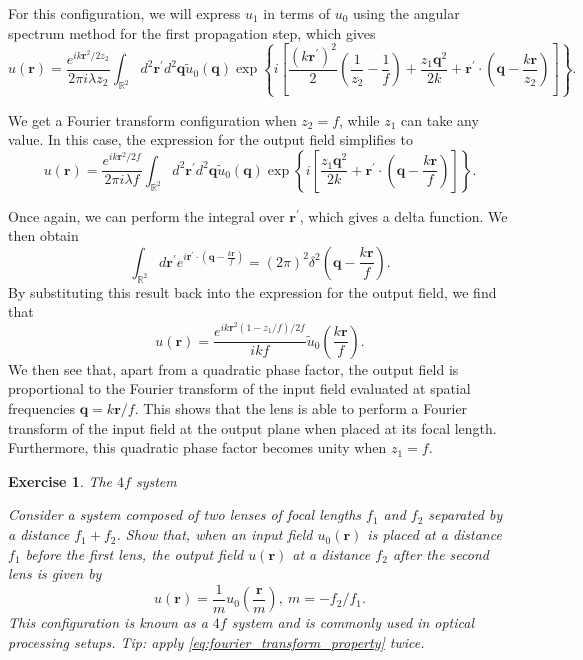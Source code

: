 \documentclass[a4paper,10pt]{article}
\newtheorem{exe}{Exercise}
\begin{document}
For this configuration, we will express $u_1$ in terms of $u_0$ using the angular spectrum method for the first propagation step, which gives
\begin{equation}
    u(\mathbf{r}) = \frac{e^{i k \mathbf{r}^2 / 2 z_2}}{2\pi i \lambda z_2} \int_{\mathbb{R}^2} d^2\mathbf{r}^\prime d^2 \mathbf{q}  \tilde{u}_0(\mathbf{q}) \exp\left\{ i \left[ \frac{(k\mathbf{r}^\prime)^2}{2} \left(\frac{1}{z_2} - \frac{1}{f}\right) + \frac{z_1 \mathbf{q}^2}{2k} + \mathbf{r}^\prime \cdot \left( \mathbf{q} - \frac{k\mathbf{r} }{z_2} \right) \right]  \right\}  .
\end{equation}

We get a Fourier transform configuration when $z_2 = f$, while $z_1$ can take any value. In this case, the expression for the output field simplifies to
\begin{equation}
    u(\mathbf{r}) = \frac{e^{i k \mathbf{r}^2 / 2 f}}{2\pi i \lambda f} \int_{\mathbb{R}^2} d^2\mathbf{r}^\prime d^2 \mathbf{q}  \tilde{u}_0(\mathbf{q}) \exp\left\{ i \left[ \frac{z_1 \mathbf{q}^2}{2k} + \mathbf{r}^\prime \cdot \left( \mathbf{q} - \frac{k\mathbf{r} }{f} \right) \right]  \right\}  .
\end{equation}

Once again, we can perform the integral over $\mathbf{r}^\prime$, which gives a delta function. We then obtain
\begin{equation}
    \int_{\mathbb{R}^2} d\mathbf{r}^\prime e^{i \mathbf{r}^\prime \cdot \left( \mathbf{q} - \frac{k\mathbf{r} }{f} \right)} = (2 \pi)^2 \delta^2 \left( \mathbf{q} - \frac{k\mathbf{r}}{f} \right).
\end{equation}
By substituting this result back into the expression for the output field, we find that
\begin{equation}
    \label{eq:fourier_transform_property}
    u(\mathbf{r}) = \frac{e^{i k \mathbf{r}^2(1 - z_1/f) / 2 f}}{ik f}  \tilde{u}_0\left( \frac{k\mathbf{r}}{f} \right).
\end{equation}
We then see that, apart from a quadratic phase factor, the output field is proportional to the Fourier transform of the input field evaluated at spatial frequencies $\mathbf{q} = k \mathbf{r} / f$. This shows that the lens is able to perform a Fourier transform of the input field at the output plane when placed at its focal length. Furthermore, this quadratic phase factor becomes unity when $z_1 = f$.

\begin{exe}{The $4f$ system}

    Consider a system composed of two lenses of focal lengths $f_1$ and $f_2$ separated by a distance $f_1 + f_2$. Show that, when an input field $u_0(\mathbf{r})$ is placed at a distance $f_1$ before the first lens, the output field $u(\mathbf{r})$ at a distance $f_2$ after the second lens is given by
    \begin{equation}
        u(\mathbf{r}) = \frac{1}{m} u_0\left( \frac{\mathbf{r}}{m}  \right), \ m = -f_2/f_1.
    \end{equation}
    This configuration is known as a $4f$ system and is commonly used in optical processing setups. Tip: apply \eqref{eq:fourier_transform_property} twice.
\end{exe}



\end{document}

